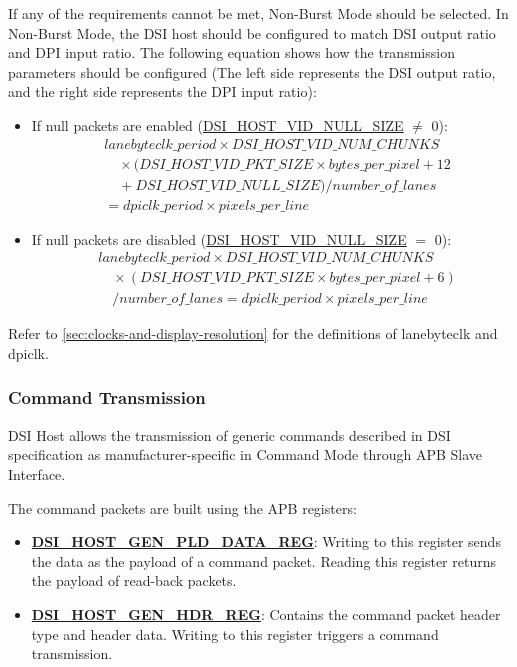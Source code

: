 \documentclass[main\_\_EN.tex]{subfiles}
\begin{document}
If any of the requirements cannot be met, Non-Burst Mode should be selected. In Non-Burst Mode, the DSI host should be configured to match DSI output ratio and DPI input ratio. The following equation shows how the transmission parameters should be configured (The left side represents the DSI output ratio, and the right side represents the DPI input ratio):
\begin{itemize}
    \item If null packets are enabled (\hyperref[fielddesc:DSIHOSTVIDNULLSIZE]{DSI\_HOST\_VID\_NULL\_SIZE} $\neq$ 0):
    \begin{align*}
    & lanebyteclk\_period \times \hyperref[fielddesc:DSIHOSTVIDNUMCHUNKS]{DSI\_HOST\_VID\_NUM\_CHUNKS} \\
    & \quad \times (\hyperref[fielddesc:DSIHOSTVIDPKTSIZE]{DSI\_HOST\_VID\_PKT\_SIZE} \times bytes\_per\_pixel + 12 \\
    & \quad + \hyperref[fielddesc:DSIHOSTVIDNULLSIZE]{DSI\_HOST\_VID\_NULL\_SIZE}) / number\_of\_lanes \\
    &= dpiclk\_period \times pixels\_per\_line
    \end{align*}
    \item If null packets are disabled (\hyperref[fielddesc:DSIHOSTVIDNULLSIZE]{DSI\_HOST\_VID\_NULL\_SIZE} $=$ 0):
    \begin{align*}
    & lanebyteclk\_period \times \hyperref[fielddesc:DSIHOSTVIDNUMCHUNKS]{DSI\_HOST\_VID\_NUM\_CHUNKS} \\
    & \quad \times (\hyperref[fielddesc:DSIHOSTVIDPKTSIZE]{DSI\_HOST\_VID\_PKT\_SIZE} \times bytes\_per\_pixel + 6) \\
    & \quad / number\_of\_lanes = dpiclk\_period \times pixels\_per\_line
    \end{align*}
\end{itemize}

Refer to \ref{sec:clocks-and-display-resolution} for the definitions of lanebyteclk and dpiclk.

\subsubsection{Command Transmission}
\label{sec:command-transmission}
DSI Host allows the transmission of generic commands described in DSI specification as manufacturer-specific in Command Mode through APB Slave Interface.

The command packets are built using the APB registers:
\begin{itemize}
    \item \textbf{\hyperref[regdesc:DSIHOSTGENPLDDATAREG]{DSI\_HOST\_GEN\_PLD\_DATA\_REG}}: Writing to this register sends the data as the payload of a command packet. Reading this register returns the payload of read-back packets.
    \item \textbf{\hyperref[regdesc:DSIHOSTGENHDRREG]{DSI\_HOST\_GEN\_HDR\_REG}}: Contains the command packet header type and header data. Writing to this register triggers a command transmission.
\end{itemize}
\end{document}
